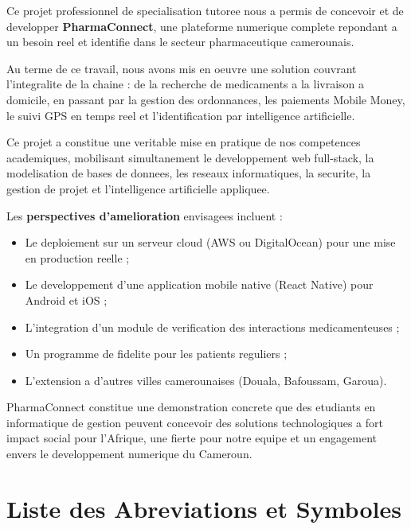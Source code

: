 \documentclass[12pt,a4paper]{report}
\begin{document}
Ce projet professionnel de specialisation tutoree nous a permis de concevoir et de developper \textbf{PharmaConnect}, une plateforme numerique complete repondant a un besoin reel et identifie dans le secteur pharmaceutique camerounais.

Au terme de ce travail, nous avons mis en oeuvre une solution couvrant l'integralite de la chaine : de la recherche de medicaments a la livraison a domicile, en passant par la gestion des ordonnances, les paiements Mobile Money, le suivi GPS en temps reel et l'identification par intelligence artificielle.

Ce projet a constitue une veritable mise en pratique de nos competences academiques, mobilisant simultanement le developpement web full-stack, la modelisation de bases de donnees, les reseaux informatiques, la securite, la gestion de projet et l'intelligence artificielle appliquee.

\bigskip
\noindent Les \textbf{perspectives d'amelioration} envisagees incluent :
\begin{itemize}[label=\textcolor{vertpharma}{\textbullet}]
    \item Le deploiement sur un serveur cloud (AWS ou DigitalOcean) pour une mise en production reelle ;
    \item Le developpement d'une application mobile native (React Native) pour Android et iOS ;
    \item L'integration d'un module de verification des interactions medicamenteuses ;
    \item Un programme de fidelite pour les patients reguliers ;
    \item L'extension a d'autres villes camerounaises (Douala, Bafoussam, Garoua).
\end{itemize}

\bigskip
PharmaConnect constitue une demonstration concrete que des etudiants en informatique de gestion peuvent concevoir des solutions technologiques a fort impact social pour l'Afrique, une fierte pour notre equipe et un engagement envers le developpement numerique du Cameroun.

\appendix
\renewcommand{\chaptername}{Annexe}

\chapter{Liste des Abreviations et Symboles}
\end{document}

